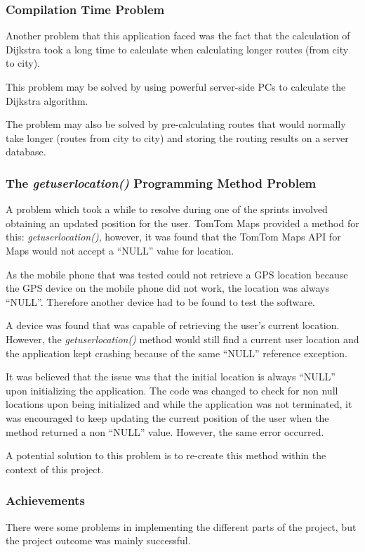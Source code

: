 \documentclass[12pt,a4paper]{article}
\begin{document}
\subsubsection{Compilation Time Problem}
Another problem that this application faced was the fact that the calculation of Dijkstra took a long time to calculate when calculating longer routes (from city to city).

This problem may be solved by using powerful server-side PCs to calculate the Dijkstra algorithm. 

The problem may also be solved by pre-calculating routes that would normally take longer (routes from city to city) and storing the routing results on a server database.

\subsubsection{The \textit{getuserlocation()} Programming Method Problem}
A problem which took a while to resolve during one of the sprints involved obtaining an updated position for the user. TomTom Maps provided a method for this: \textit{getuserlocation()}, however, it was found that the TomTom Maps API for Maps would not accept a \enquote{NULL} value for location. 

As the mobile phone that was tested could not retrieve a GPS location because the GPS device on the mobile phone did not work, the location was always \enquote{NULL}. Therefore another device had to be found to test the software.

A device was found that was capable of retrieving the user's current location. However, the \textit{getuserlocation()} method would still find a current user location and the application kept crashing because of the same \enquote{NULL} reference exception.

It was believed that the issue was that the initial location is always \enquote{NULL} upon initializing the application. The code was changed to check for non null locations upon being initialized and while the application was not terminated, it was encouraged to keep updating the current position of the user when the method returned a non \enquote{NULL} value. However, the same error occurred.  

A potential solution to this problem is to re-create this method within the context of this project. 

\subsubsection{Achievements}
There were some problems in implementing the different parts of the project, but the project outcome was mainly successful.
\end{document}
